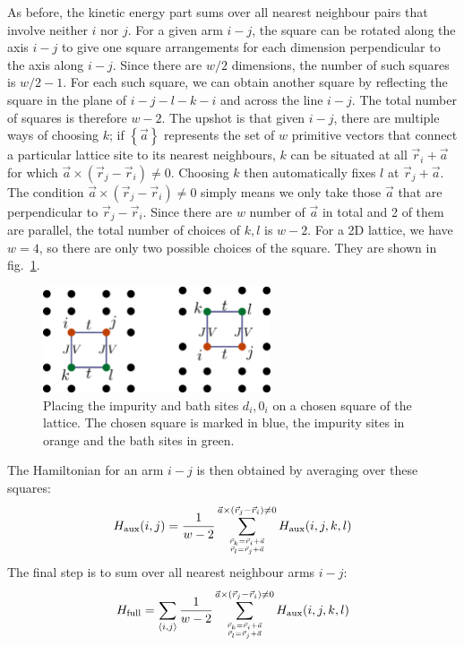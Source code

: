 \documentclass{report}
\numberwithin{equation}{section}
\begin{document}
As before, the kinetic energy part sums over all nearest neighbour pairs that involve neither \(i\) nor \(j\). For a given arm \(i-j\), the square can be rotated along the axis \(i-j\) to give one square arrangements for each dimension perpendicular to the axis along \(i-j\). Since there are \(w/2\) dimensions, the number of such squares is \(w/2 - 1\). For each such square, we can obtain another square by reflecting the square in the plane of \(i-j-l-k-i\) and across the line \(i-j\). The total number of squares is therefore \(w - 2\). The upshot is that given \(i-j\), there are multiple ways of choosing \(k\); if \(\left\{\vec a\right\}\) represents the set of \(w\) primitive vectors that connect a particular lattice site to its nearest neighbours, \(k\) can be situated at all \(\vec r_i + \vec a\) for which \(\vec a \times \left(\vec r_j - \vec r_i\right) \neq 0\). Choosing \(k\) then automatically fixes \(l\) at \(\vec r_j + \vec a\). The condition \(\vec a \times \left(\vec r_j - \vec r_i\right) \neq 0\) simply means we only take those \(\vec a\) that are perpendicular to \(\vec r_j - \vec r_i\). Since there are \(w\) number of \(\vec a\) in total and 2 of them are parallel, the total number of choices of \(k,l\) is \(w-2\).  For a 2D lattice, we have \(w=4\), so there are only two possible choices of the square. They are shown in fig.~\ref{square-arms-all}.
\begin{figure}[!htb]
	\centering
	\includegraphics[width=0.6\textwidth]{../figures/square_arms_all.pdf}
	\caption{Placing the impurity and bath sites \(d_i,0_i\) on a chosen square of the lattice. The chosen square is marked in blue, the impurity sites in orange and the bath sites in green.}
	\label{square-arms-all}
\end{figure}

The Hamiltonian for an arm \(i-j\) is then obtained by averaging over these squares:
\begin{equation}\begin{aligned}
	H_\text{aux}(i,j) = \frac{1}{w - 2}\sum_{\vec r_k = \vec r_i + \vec a \atop{\vec r_l = \vec r_j + \vec a}}^{\vec a \times \left(\vec r_j - \vec r_i\right) \neq 0}H_\text{aux}(i,j,k,l)
\end{aligned}\end{equation}
The final step is to sum over all nearest neighbour arms \(i-j\):
\begin{equation}\begin{aligned}
	\label{22siam_to_hubb}
	H_\text{full} = \sum_{\left<i,j\right>}\frac{1}{w - 2}\sum_{\vec r_k = \vec r_i + \vec a \atop{\vec r_l = \vec r_j + \vec a}}^{\vec a \times \left(\vec r_j - \vec r_i\right) \neq 0}H_\text{aux}(i,j,k,l)
\end{aligned}\end{equation}
\end{document}
